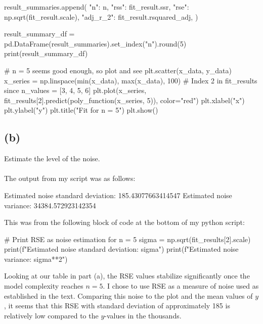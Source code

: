 \documentclass{article}
\begin{document}
{\begin{spverbatim}
  result_summaries.append({
    "n": n,
    "rss": fit_result.ssr,
    "rse": np.sqrt(fit_result.scale),
    "adj_r_2": fit_result.rsquared_adj,
  })

result_summary_df = pd.DataFrame(result_summaries).set_index("n").round(5)
print(result_summary_df)

# n = 5 seems good enough, so plot and see
plt.scatter(x_data, y_data)
x_series = np.linspace(min(x_data), max(x_data), 100)
# Index 2 in fit_results since n_values = [3, 4, 5, 6]
plt.plot(x_series, fit_results[2].predict(poly_function(x_series, 5)), color="red")
plt.xlabel("x")
plt.ylabel("y")
plt.title("Fit for n = 5")
plt.show()
\end{spverbatim}

\subsection*{(b)}
Estimate the level of the noise. \\ \\
The output from my script was as follows:
\begin{spverbatim}
Estimated noise standard deviation: 185.43077663414547
Estimated noise variance: 34384.572923142354
\end{spverbatim}
This was from the following block of code at the bottom of my python script:
\begin{spverbatim}
# Print RSE as noise estimation for n = 5
sigma = np.sqrt(fit_results[2].scale)
print(f"Estimated noise standard deviation: {sigma}")
print(f"Estimated noise variance: {sigma**2}")
\end{spverbatim}
Looking at our table in part (a), the RSE values stabilize significantly once the model complexity reaches \(n=5\). I chose to use RSE as a measure of noise used as established in the text. Comparing this noise to the plot and the mean values of \(y\), it seems that this RSE with standard deviation of approximately 185 is relatively low compared to the \(y\)-values in the thousands.

}
\end{document}
